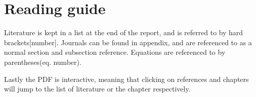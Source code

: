 \documentclass[../../main]{subfiles}
\begin{document}
\section*{Reading guide}
\label{sec:reading_guide}
Literature is kept in a list at the end of the report, and is referred to by hard brackets[number].
Journals can be found in appendix, and are referenced to as a normal section and subsection reference.
Equations are referenced to by parentheses(eq. number).

Lastly the PDF is interactive, meaning that clicking on references and chapters will jump to the list of literature or the chapter respectively.
\end{document}
